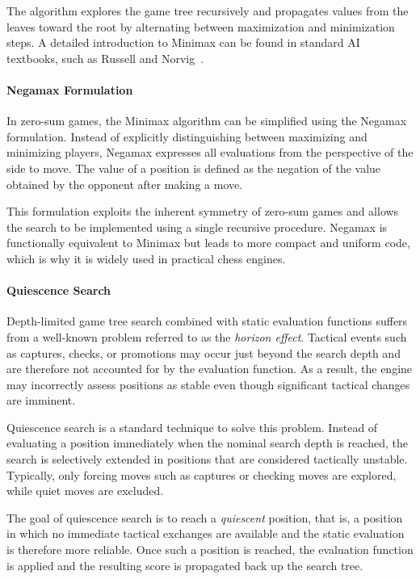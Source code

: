 The algorithm explores the game tree recursively and propagates values from the
leaves toward the root by alternating between maximization and minimization
steps. A detailed introduction to Minimax can be found in standard AI textbooks,
such as Russell and Norvig~\cite{russell2010aima}.

\paragraph{Negamax Formulation}
In zero-sum games, the Minimax algorithm can be simplified using the Negamax
formulation. Instead of explicitly distinguishing between maximizing and
minimizing players, Negamax expresses all evaluations from the perspective of the
side to move. The value of a position is defined as the negation of the value
obtained by the opponent after making a move.

This formulation exploits the inherent symmetry of zero-sum games and allows the
search to be implemented using a single recursive procedure. Negamax is
functionally equivalent to Minimax but leads to more compact and uniform code,
which is why it is widely used in practical chess engines.

\paragraph{Quiescence Search}
Depth-limited game tree search combined with static evaluation functions suffers
from a well-known problem referred to as the \emph{horizon effect}. Tactical
events such as captures, checks, or promotions may occur just beyond the search
depth and are therefore not accounted for by the evaluation function. As a
result, the engine may incorrectly assess positions as stable even though
significant tactical changes are imminent.

Quiescence search is a standard technique to solve this problem. Instead of
evaluating a position immediately when the nominal search depth is reached, the
search is selectively extended in positions that are considered tactically
unstable. Typically, only forcing moves such as captures or checking moves are
explored, while quiet moves are excluded.

The goal of quiescence search is to reach a \emph{quiescent} position, that is, a
position in which no immediate tactical exchanges are available and the static
evaluation is therefore more reliable. Once such a position is reached, the
evaluation function is applied and the resulting score is propagated back up the
search tree.


